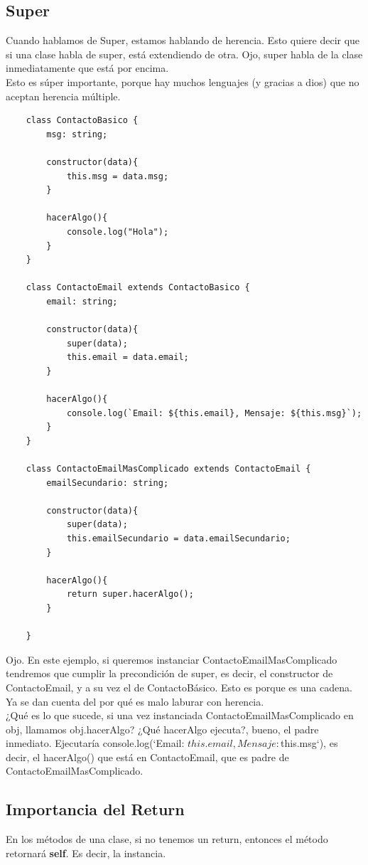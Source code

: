 \documentclass[10pt,a4paper]{article}
\begin{document}
\subsection*{Super}
Cuando hablamos de Super, estamos hablando de herencia. Esto quiere decir que si una clase habla de super, está extendiendo de otra. Ojo, super habla de la clase inmediatamente que está por encima. \\
Esto es súper importante, porque hay muchos lenguajes (y gracias a dios) que no aceptan herencia múltiple. 
\begin{lstlisting}
    class ContactoBasico {
        msg: string;

        constructor(data){
            this.msg = data.msg;
        }

        hacerAlgo(){
            console.log("Hola");
        }
    }

    class ContactoEmail extends ContactoBasico {
        email: string;

        constructor(data){
            super(data);
            this.email = data.email;
        }

        hacerAlgo(){
            console.log(`Email: ${this.email}, Mensaje: ${this.msg}`);
        }
    }

    class ContactoEmailMasComplicado extends ContactoEmail {
        emailSecundario: string; 

        constructor(data){
            super(data);
            this.emailSecundario = data.emailSecundario;
        }

        hacerAlgo(){
            return super.hacerAlgo();
        }

    }
\end{lstlisting}
Ojo. En este ejemplo, si queremos instanciar ContactoEmailMasComplicado tendremos que cumplir la precondición de super, es decir, el constructor de ContactoEmail, y a su vez el de ContactoBásico. Esto es porque es una cadena. Ya se dan cuenta del por qué es malo laburar con herencia. \\
¿Qué es lo que sucede, si una vez instanciada ContactoEmailMasComplicado en obj, llamamos obj.hacerAlgo? ¿Qué hacerAlgo ejecuta?, bueno, el padre inmediato. Ejecutaría  console.log(`Email: ${this.email}, Mensaje: ${this.msg}`), es decir, el hacerAlgo() que está en ContactoEmail, que es padre de ContactoEmailMasComplicado. 
\subsection*{Importancia del Return}
En los métodos de una clase, si no tenemos un return, entonces el método retornará \textbf{self}. Es decir, la instancia. 
\end{document}
